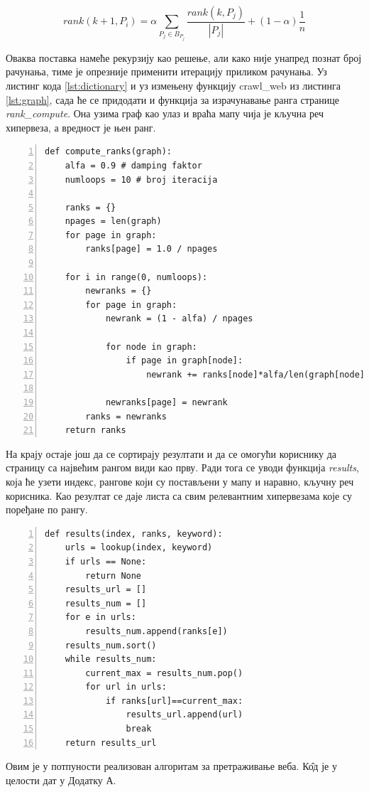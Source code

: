 \begin{equation}
rank(k+1, P_{i})=\alpha \sum_{P_{j} \in B_{P_{j}}}\frac{rank(k, P_{j})}{\left |P_{j}  \right |} + (1-\alpha)\frac{1}{n}
\end{equation}

Оваква поставка намеће рекурзију као решење, али како
није унапред познат број рачунања, тиме је опрезније применити итерацију
приликом рачунања. Уз листинг кода \ref{lst:dictionary} и уз измењену функцију
crawl\_web из листинга \ref{lst:graph}, сада ће се придодати и функција за
израчунавање ранга странице \emph{rank\_compute}. Она узима граф као улаз и враћа мапу чија је кључна реч хипервеза, а вредност је њен ранг.

\begin{lstlisting}[caption=Израчунавање ранга странице, label={lst:rank}, numbers=left]
def compute_ranks(graph):
    alfa = 0.9 # damping faktor
    numloops = 10 # broj iteracija

    ranks = {}
    npages = len(graph)
    for page in graph:
        ranks[page] = 1.0 / npages

    for i in range(0, numloops):
        newranks = {}
        for page in graph:
            newrank = (1 - alfa) / npages

            for node in graph:
                if page in graph[node]:
                    newrank += ranks[node]*alfa/len(graph[node])

            newranks[page] = newrank
        ranks = newranks
    return ranks
\end{lstlisting}

На крају остаје још да се сортирају резултати и да се омогући кориснику да страницу са највећим рангом види као прву. Ради тога се уводи функција \emph{results}, која ће узети индекс, рангове који су постављени у мапу и наравно, кључну реч корисника. Као резултат се даје листа са свим релевантним хипервезама које су поређане по рангу.

\begin{lstlisting}[caption=Функција која враћа најбољи резултат, label={lst:results}, numbers=left]
def results(index, ranks, keyword):
    urls = lookup(index, keyword)
    if urls == None:
        return None
    results_url = []
    results_num = []
    for e in urls:
        results_num.append(ranks[e])
    results_num.sort()
    while results_num:
        current_max = results_num.pop()
        for url in urls:
            if ranks[url]==current_max:
                results_url.append(url)
                break
    return results_url

\end{lstlisting}

Овим је у потпуности реализован алгоритам за претраживање веба. К\^{о}д је у целости дат у Додатку А.
